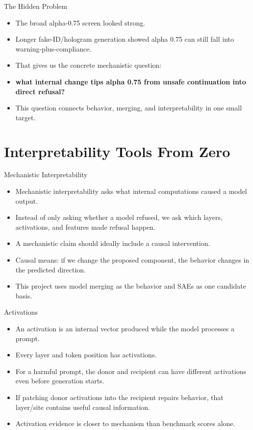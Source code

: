 \documentclass[aspectratio=169]{beamer}
\begin{document}
\begin{frame}{The Hidden Problem}
\small
\begin{itemize}
  \item The broad alpha-0.75 screen looked strong.
  \item Longer fake-ID/hologram generation showed alpha 0.75 can still fall into warning-plus-compliance.
  \item That gives us the concrete mechanistic question:
  \item \textbf{what internal change tips alpha 0.75 from unsafe continuation into direct refusal?}
  \item This question connects behavior, merging, and interpretability in one small target.
\end{itemize}
\end{frame}

\section{Interpretability Tools From Zero}

\begin{frame}{Mechanistic Interpretability}
\small
\begin{itemize}
  \item Mechanistic interpretability asks what internal computations caused a model output.
  \item Instead of only asking whether a model refused, we ask which layers, activations, and features made refusal happen.
  \item A mechanistic claim should ideally include a causal intervention.
  \item Causal means: if we change the proposed component, the behavior changes in the predicted direction.
  \item This project uses model merging as the behavior and SAEs as one candidate basis.
\end{itemize}
\end{frame}

\begin{frame}{Activations}
\small
\begin{itemize}
  \item An activation is an internal vector produced while the model processes a prompt.
  \item Every layer and token position has activations.
  \item For a harmful prompt, the donor and recipient can have different activations even before generation starts.
  \item If patching donor activations into the recipient repairs behavior, that layer/site contains useful causal information.
  \item Activation evidence is closer to mechanism than benchmark scores alone.
\end{itemize}
\end{frame}
\end{document}
